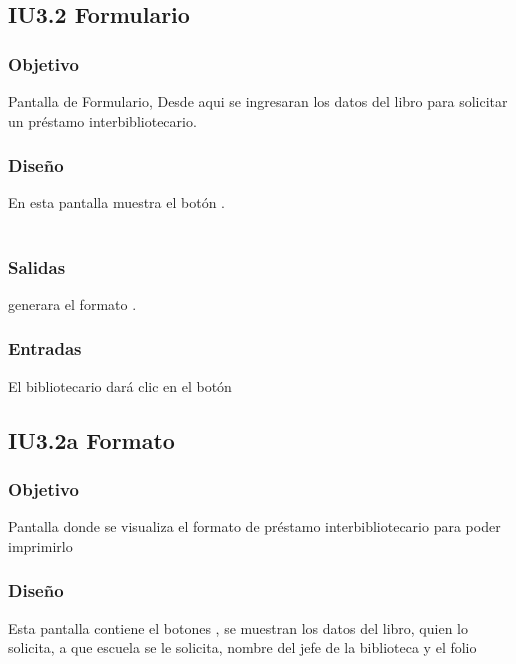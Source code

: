 \newpage
\subsection{IU3.2 Formulario}

\subsubsection{Objetivo}
	Pantalla de Formulario, Desde aqui se ingresaran los datos del libro para solicitar un préstamo interbibliotecario.  

\subsubsection{Diseño}
	En esta pantalla muestra el botón .  \\\\


\subsubsection{Salidas}
	\begin{Citemize}
		\item generara el formato . 
	\end{Citemize}
	
\subsubsection{Entradas}
	\begin{Citemize}
		\item El bibliotecario dará clic en el botón \IUbutton{Guardar}
	\end{Citemize}




\subsection{IU3.2a Formato}

\subsubsection{Objetivo}
	Pantalla donde se visualiza el formato de préstamo interbibliotecario para poder imprimirlo 

\subsubsection{Diseño}
	Esta pantalla contiene el botones , se muestran los datos del libro, quien lo solicita, a que escuela se le solicita, nombre del jefe de la biblioteca y el folio  \\\\

